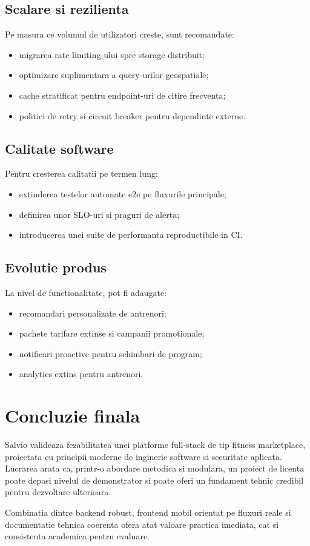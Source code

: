 \subsection{Scalare si rezilienta}

Pe masura ce volumul de utilizatori creste, sunt recomandate:
\begin{itemize}[leftmargin=1.2cm]
    \item migrarea rate limiting-ului spre storage distribuit;
    \item optimizare suplimentara a query-urilor geospatiale;
    \item cache stratificat pentru endpoint-uri de citire frecventa;
    \item politici de retry si circuit breaker pentru dependinte externe.
\end{itemize}

\subsection{Calitate software}

Pentru cresterea calitatii pe termen lung:
\begin{itemize}[leftmargin=1.2cm]
    \item extinderea testelor automate e2e pe fluxurile principale;
    \item definirea unor SLO-uri si praguri de alerta;
    \item introducerea unei suite de performanta reproductibile in CI.
\end{itemize}

\subsection{Evolutie produs}

La nivel de functionalitate, pot fi adaugate:
\begin{itemize}[leftmargin=1.2cm]
    \item recomandari personalizate de antrenori;
    \item pachete tarifare extinse si campanii promotionale;
    \item notificari proactive pentru schimbari de program;
    \item analytics extins pentru antrenori.
\end{itemize}

\section{Concluzie finala}

Salvio valideaza fezabilitatea unei platforme full-stack de tip fitness marketplace, proiectata cu principii moderne de inginerie software si securitate aplicata. Lucrarea arata ca, printr-o abordare metodica si modulara, un proiect de licenta poate depasi nivelul de demonstrator si poate oferi un fundament tehnic credibil pentru dezvoltare ulterioara.

Combinatia dintre backend robust, frontend mobil orientat pe fluxuri reale si documentatie tehnica coerenta ofera atat valoare practica imediata, cat si consistenta academica pentru evaluare.

